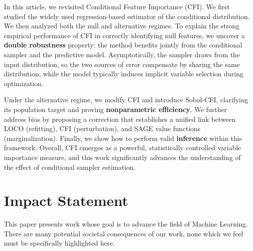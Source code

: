 \documentclass{article}
\theoremstyle{plain}
\theoremstyle{definition}
\theoremstyle{remark}
\begin{document}
In this article, we revisited Conditional Feature Importance (CFI). We first studied the widely used regression-based estimator of the conditional distribution. We then analyzed both the null and alternative regimes. To explain the strong empirical performance of CFI in correctly identifying null features, we uncover a \textbf{double robustness} property: the method benefits jointly from the conditional sampler and the predictive model. Asymptotically, the sampler draws from the input distribution, so the two sources of error compensate by sharing the same distribution, while the model typically induces implicit variable selection during optimization.

Under the alternative regime, we modify CFI and introduce Sobol-CFI, clarifying its population target and proving \textbf{nonparametric efficiency}. We further address bias by proposing a correction that establishes a unified link between LOCO (refitting), CFI (perturbation), and SAGE value functions (marginalization). Finally, we show how to perform valid \textbf{inference} within this framework. Overall, CFI emerges as a powerful, statistically controlled variable importance measure, and this work significantly advances the understanding of the effect of conditional sampler estimation.





\section*{Impact Statement}

This paper presents work whose goal is to advance the field of Machine
Learning. There are many potential societal consequences of our work, none
which we feel must be specifically highlighted here.






\newpage
\appendix
\onecolumn
\end{document}
